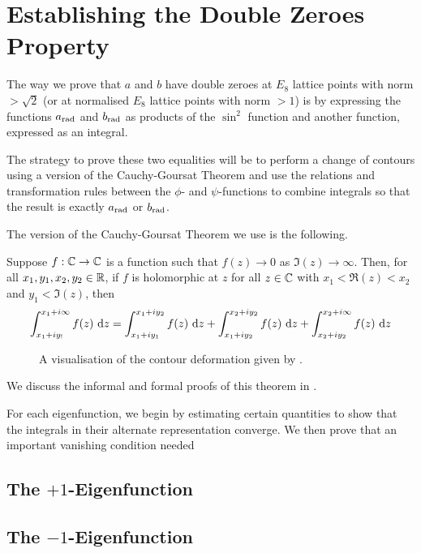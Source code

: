 \section{Establishing the Double Zeroes Property}

The way we prove that $a$ and $b$ have double zeroes at $E_8$ lattice points with norm $> \sqrt{2}$ (or at normalised $E_8$ lattice points with norm $> 1$) is by expressing the functions $a_{\operatorname{rad}}$ and $b_{\operatorname{rad}}$ as products of the $\sin^2$ function and another function, expressed as an integral.

The strategy to prove these two equalities will be to perform a change of contours using a version of the Cauchy-Goursat Theorem and use the relations and transformation rules between the $\phi$- and $\psi$-functions to combine integrals so that the result is exactly $a_{\operatorname{rad}}$ or $b_{\operatorname{rad}}$.

The version of the Cauchy-Goursat Theorem we use is the following.

\begin{boxtheorem}\label{Ch4:Thm:CauchyGoursat_Unbounded}
    Suppose $f : \mathbb{C} \to \mathbb{C}$ is a function such that $f(z) \to 0$ as $\Im(z) \to \infty$. Then, for all $x_1, y_1, x_2, y_2 \in \mathbb{R}$, if $f$ is holomorphic at $z$ for all $z \in \mathbb{C}$ with $x_1 < \Re(z) < x_2$ and $y_1 < \Im(z)$, then
    \begin{align*}
        \int_{x_1 + iy_!}^{x_1 + i\infty} f(z) \, \operatorname{d}\!{z}
        = \int_{x_1 + iy_1}^{x_1 + iy_2} f(z) \, \operatorname{d}\!{z}
        + \int_{x_1 + iy_2}^{x_2 + iy_2} f(z) \, \operatorname{d}\!{z}
        + \int_{x_2 + iy_2}^{x_2 + i\infty} f(z) \, \operatorname{d}\!{z}
    \end{align*}
\end{boxtheorem}

\begin{wrapfigure}{r}{0.4\linewidth}
    \centering
    \caption{A visualisation of the contour deformation given by .}    
\end{wrapfigure}
We discuss the informal and formal proofs of this theorem in .

For each eigenfunction, we begin by estimating certain quantities to show that the integrals in their alternate representation converge. We then prove that an important vanishing condition needed

\subsection{The $+1$-Eigenfunction}

\subsection{The $-1$-Eigenfunction}